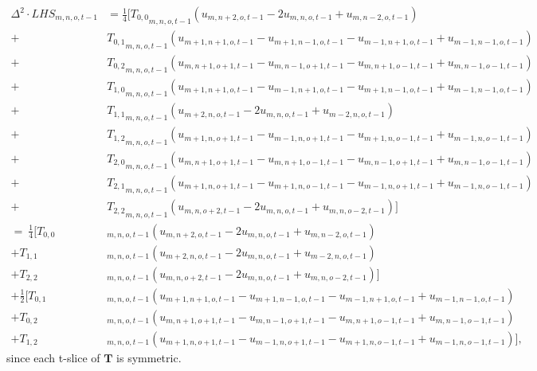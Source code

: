 \documentclass{article}
\begin{document}
\begin{align} \label{delsqrLHS explicit}
\Delta^2 \cdot LHS_{m,n,o,t-1} &= \frac{1}{4}\Big[{T_{0,0}}_{m,n,o,t-1}(u_{m,n+2,o,t-1}-2u_{m,n,o,t-1}+u_{m,n-2,o,t-1}) \nonumber \\
+&{T_{0,1}}_{m,n,o,t-1}(u_{m+1,n+1,o,t-1}-u_{m+1,n-1,o,t-1}-u_{m-1,n+1,o,t-1}+u_{m-1,n-1,o,t-1}) \nonumber \\
+&{T_{0,2}}_{m,n,o,t-1}(u_{m,n+1,o+1,t-1}-u_{m,n-1,o+1,t-1}-u_{m,n+1,o-1,t-1}+u_{m,n-1,o-1,t-1}) \nonumber \\
+&{T_{1,0}}_{m,n,o,t-1}(u_{m+1,n+1,o,t-1}-u_{m-1,n+1,o,t-1}-u_{m+1,n-1,o,t-1}+u_{m-1,n-1,o,t-1}) \nonumber \\
+&{T_{1,1}}_{m,n,o,t-1}(u_{m+2,n,o,t-1}-2u_{m,n,o,t-1}+u_{m-2,n,o,t-1}) \nonumber \\
+&{T_{1,2}}_{m,n,o,t-1}(u_{m+1,n,o+1,t-1}-u_{m-1,n,o+1,t-1}-u_{m+1,n,o-1,t-1}+u_{m-1,n,o-1,t-1}) \nonumber \\
+&{T_{2,0}}_{m,n,o,t-1}(u_{m,n+1,o+1,t-1}-u_{m,n+1,o-1,t-1}-u_{m,n-1,o+1,t-1}+u_{m,n-1,o-1,t-1}) \nonumber \\
+&{T_{2,1}}_{m,n,o,t-1}(u_{m+1,n,o+1,t-1}-u_{m+1,n,o-1,t-1}-u_{m-1,n,o+1,t-1}+u_{m-1,n,o-1,t-1}) \nonumber \\
+&{T_{2,2}}_{m,n,o,t-1}(u_{m,n,o+2,t-1}-2u_{m,n,o,t-1}+u_{m,n,o-2,t-1} )\Big] \nonumber \\
=\ \frac{1}{4}\Big[{T_{0,0}}&_{m,n,o,t-1}(u_{m,n+2,o,t-1}-2u_{m,n,o,t-1}+u_{m,n-2,o,t-1}) \nonumber \\
+{T_{1,1}}&_{m,n,o,t-1}(u_{m+2,n,o,t-1}-2u_{m,n,o,t-1}+u_{m-2,n,o,t-1}) \nonumber \\
+{T_{2,2}}&_{m,n,o,t-1}(u_{m,n,o+2,t-1}-2u_{m,n,o,t-1}+u_{m,n,o-2,t-1} )\Big] \nonumber \\
+\frac{1}{2}\Big[{T_{0,1}}&_{m,n,o,t-1}(u_{m+1,n+1,o,t-1}-u_{m+1,n-1,o,t-1}-u_{m-1,n+1,o,t-1}+u_{m-1,n-1,o,t-1}) \nonumber \\
+{T_{0,2}}&_{m,n,o,t-1}(u_{m,n+1,o+1,t-1}-u_{m,n-1,o+1,t-1}-u_{m,n+1,o-1,t-1}+u_{m,n-1,o-1,t-1}) \nonumber \\
+{T_{1,2}}&_{m,n,o,t-1}(u_{m+1,n,o+1,t-1}-u_{m-1,n,o+1,t-1}-u_{m+1,n,o-1,t-1}+u_{m-1,n,o-1,t-1})\Big],
\end{align}
since each t-slice of $\textbf{T}$ is symmetric.
\end{document}
